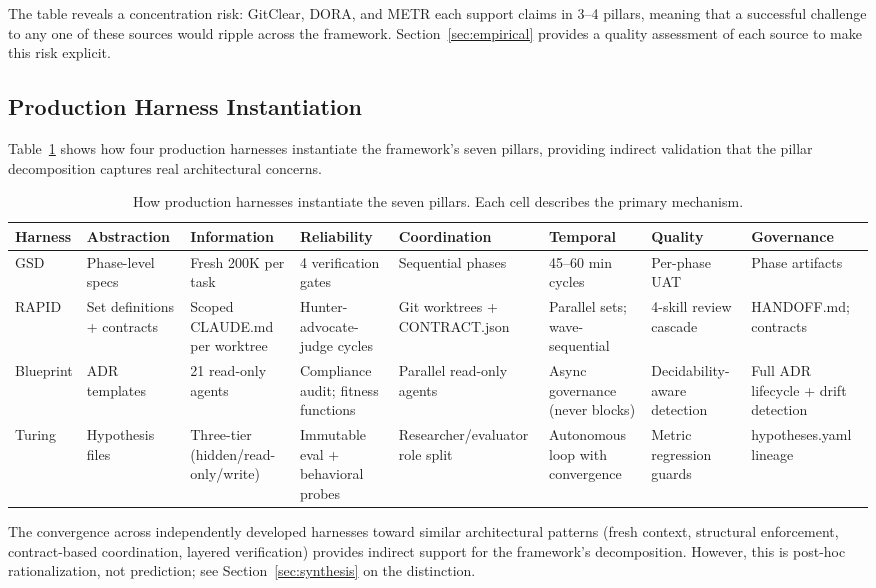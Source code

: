 \documentclass[11pt, a4paper]{googledeepmind}
\begin{document}
The table reveals a concentration risk: GitClear, DORA, and METR each support claims in 3--4 pillars, meaning that a successful challenge to any one of these sources would ripple across the framework. Section~\ref{sec:empirical} provides a quality assessment of each source to make this risk explicit.

\subsection{Production Harness Instantiation}

Table~\ref{tab:harness-comparison} shows how four production harnesses instantiate the framework's seven pillars, providing indirect validation that the pillar decomposition captures real architectural concerns.

\begin{table}[ht]
\centering
\caption{How production harnesses instantiate the seven pillars. Each cell describes the primary mechanism.}
\label{tab:harness-comparison}
\scriptsize
\begin{tabular}{p{1.3cm}p{1.8cm}p{1.8cm}p{1.8cm}p{1.8cm}p{1.8cm}p{1.8cm}p{1.8cm}}
\toprule
\textbf{Harness} & \textbf{Abstraction} & \textbf{Information} & \textbf{Reliability} & \textbf{Coordination} & \textbf{Temporal} & \textbf{Quality} & \textbf{Governance} \\
\midrule
GSD & Phase-level specs & Fresh 200K per task & 4 verification gates & Sequential phases & 45--60 min cycles & Per-phase UAT & Phase artifacts \\
\addlinespace
RAPID & Set definitions + contracts & Scoped CLAUDE.md per worktree & Hunter-advocate-judge cycles & Git worktrees + CONTRACT.json & Parallel sets; wave-sequential & 4-skill review cascade & HANDOFF.md; contracts \\
\addlinespace
Blueprint & ADR templates & 21 read-only agents & Compliance audit; fitness functions & Parallel read-only agents & Async governance (never blocks) & Decidability-aware detection & Full ADR lifecycle + drift detection \\
\addlinespace
Turing & Hypothesis files & Three-tier (hidden/read-only/write) & Immutable eval + behavioral probes & Researcher/evaluator role split & Autonomous loop with convergence & Metric regression guards & hypotheses.yaml lineage \\
\bottomrule
\end{tabular}
\end{table}

The convergence across independently developed harnesses toward similar architectural patterns (fresh context, structural enforcement, contract-based coordination, layered verification) provides indirect support for the framework's decomposition. However, this is post-hoc rationalization, not prediction; see Section~\ref{sec:synthesis} on the distinction.
\end{document}

